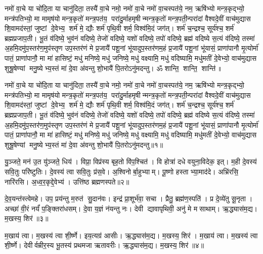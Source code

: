 \setcounter{anuvakam}{0}
नमो॑ वा॒चे या चो॑दि॒ता या चानु॑दिता॒ तस्यै॑ वा॒चे नमो॒ नमो॑ वा॒चे नमो॑ वा॒चस्पत॑ये॒ नम॒ ऋषि॑भ्यो मन्त्र॒कृद्भ्यो॒ मन्त्र॑पतिभ्यो॒ मा मामृष॑यो मन्त्र॒कृतो॑ मन्त्र॒पत॑य॒ परा॑दु॒र्माहमृषीन्मन्त्र॒कृतो॑ मन्त्र॒पती॒न्परा॑दां वैश्वदे॒वीं वाच॑मुद्यास शि॒वामद॑स्तां॒ जुष्टां दे॒वेभ्य॒ शर्म॑ मे॒ द्यौः  शर्म॑ पृथि॒वी शर्म॒ विश्व॑मि॒दं जग॑त्। शर्म॑ च॒न्द्रश्च॒ सूर्य॑श्च॒ शर्म॑ ब्रह्मप्रजाप॒ती। भू॒तं व॑दिष्ये॒ भुव॑नं वदिष्ये॒ तेजो॑ वदिष्ये॒ यशो॑ वदिष्ये॒ तपो॑ वदिष्ये॒ ब्रह्म॑ वदिष्ये स॒त्यं व॑दिष्ये॒ तस्मा॑ अ॒हमि॒दमु॑प॒स्तर॑ण॒मुप॑स्तृण उप॒स्तर॑णं मे प्र॒जायै॑ पशू॒नां भू॑यादुप॒स्तर॑णम॒हं प्र॒जायै॑ पशू॒नां भू॑यासं॒ प्राणा॑पानौ मृ॒त्योर्मा॑ पातं॒ प्राणा॑पानौ॒ मा मा॑ हासिष्टं॒ मधु॑ मनिष्ये॒ मधु॑ जनिष्ये॒ मधु॑ वक्ष्यामि॒ मधु॑ वदिष्यामि॒ मधु॑मतीं दे॒वेभ्यो॒ वाच॑मुद्यास शुश्रू॒षेण्यां मनु॒ष्येभ्य॒स्तं मा॑ दे॒वा अ॑वन्तु शो॒भायै॑ पि॒तरोऽनु॑मदन्तु। ॐ शान्ति॒ शान्ति॒ शान्ति॑॥ 

नमो॑ वा॒चे या चो॑दि॒ता या चानु॑दिता॒ तस्यै॑ वा॒चे नमो॒ नमो॑ वा॒चे नमो॑ वा॒चस्पत॑ये॒ नम॒ ऋषि॑भ्यो मन्त्र॒कृद्भ्यो॒ मन्त्र॑पतिभ्यो॒ मा मामृष॑यो मन्त्र॒कृतो॑ मन्त्र॒पत॑य॒ परा॑दु॒र्माहमृषीन्मन्त्र॒कृतो॑ मन्त्र॒पती॒न्परा॑दां वैश्वदे॒वीं वाच॑मुद्यास शि॒वामद॑स्तां॒ जुष्टां दे॒वेभ्य॒ शर्म॑ मे॒ द्यौः  शर्म॑ पृथि॒वी शर्म॒ विश्व॑मि॒दं जग॑त्। शर्म॑ च॒न्द्रश्च॒ सूर्य॑श्च॒ शर्म॑ ब्रह्मप्रजाप॒ती। भू॒तं व॑दिष्ये॒ भुव॑नं वदिष्ये॒ तेजो॑ वदिष्ये॒ यशो॑ वदिष्ये॒ तपो॑ वदिष्ये॒ ब्रह्म॑ वदिष्ये स॒त्यं व॑दिष्ये॒ तस्मा॑ अ॒हमि॒दमु॑प॒स्तर॑ण॒मुप॑स्तृण उप॒स्तर॑णं मे प्र॒जायै॑ पशू॒नां भू॑यादुप॒स्तर॑णम॒हं प्र॒जायै॑ पशू॒नां भू॑यासं॒ प्राणा॑पानौ मृ॒त्योर्मा॑ पातं॒ प्राणा॑पानौ॒ मा मा॑ हासिष्टं॒ मधु॑ मनिष्ये॒ मधु॑ जनिष्ये॒ मधु॑ वक्ष्यामि॒ मधु॑ वदिष्यामि॒ मधु॑मतीं दे॒वेभ्यो॒ वाच॑मुद्यास शुश्रू॒षेण्यां मनु॒ष्येभ्य॒स्तं मा॑ दे॒वा अ॑वन्तु शो॒भायै॑ पि॒तरोऽनु॑मदन्तु॥१॥\anuvakamend

यु॒ञ्जते॒ मन॑ उ॒त यु॑ञ्जते॒ धिय॑। विप्रा॒ विप्र॑स्य बृह॒तो वि॑प॒श्चित॑। वि होत्रा॑ दधे वयुना॒विदेक॒ इत्। म॒ही दे॒वस्य॑ सवि॒तुः परि॑ष्टुतिः। दे॒वस्य॑ त्वा सवि॒तुः प्र॑स॒वे। अ॒श्विनोर्बा॒हुभ्याम्। पू॒ष्णो हस्ताभ्या॒माद॑दे। अभ्रि॑रसि॒ नारि॑रसि। अ॒ध्व॒र॒कृद्दे॒वेभ्य॑। उत्ति॑ष्ठ ब्रह्मणस्पते॥२॥

दे॒व॒यन्त॑स्त्वेमहे। उप॒ प्रय॑न्तु म॒रुत॑ सु॒दान॑वः। इन्द्र॑ प्रा॒शूर्भ॑वा॒ सचा। प्रैतु॒ ब्रह्म॑ण॒स्पति॑। प्र दे॒व्ये॑तु सू॒नृता। अच्छा॑ वी॒रं नर्यं॑ प॒ङ्क्तिरा॑धसम्। दे॒वा य॒ज्ञं न॑यन्तु नः। देवी द्यावापृथिवी॒ अनु॑ मे मसाथाम्। ऋ॒द्ध्यास॑म॒द्य। म॒खस्य॒ शिर॑॥३॥

म॒खाय॑ त्वा। म॒खस्य॑ त्वा शी॒र्ष्णे। इय॒त्यग्र॑ आसीः। ऋ॒द्ध्यास॑म॒द्य। म॒खस्य॒ शिर॑। म॒खाय॑ त्वा। म॒खस्य॑ त्वा शी॒र्ष्णे। देवीर्वम्रीर॒स्य भू॒तस्य॑ प्रथमजा ऋतावरीः। ऋ॒द्ध्यास॑म॒द्य। म॒खस्य॒ शिर॑॥४॥

